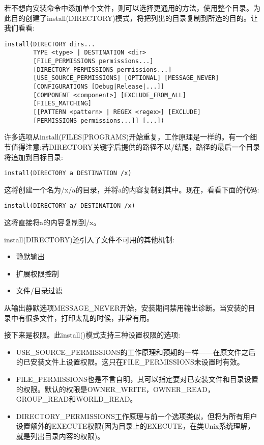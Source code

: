 若不想向安装命令中添加单个文件，则可以选择更通用的方法，使用整个目录。为此目的创建了install(DIRECTORY)模式，将把列出的目录复制到所选的目的。让我们看看:

\begin{lstlisting}[style=styleCMake]
install(DIRECTORY dirs...
		TYPE <type> | DESTINATION <dir>
		[FILE_PERMISSIONS permissions...]
		[DIRECTORY_PERMISSIONS permissions...]
		[USE_SOURCE_PERMISSIONS] [OPTIONAL] [MESSAGE_NEVER]
		[CONFIGURATIONS [Debug|Release|...]]
		[COMPONENT <component>] [EXCLUDE_FROM_ALL]
		[FILES_MATCHING]
		[[PATTERN <pattern> | REGEX <regex>] [EXCLUDE]
		[PERMISSIONS permissions...]] [...])
\end{lstlisting}

许多选项从install(FILES|PROGRAMS)开始重复，工作原理是一样的。有一个细节值得注意:若DIRECTORY关键字后提供的路径不以/结尾，路径的最后一个目录将追加到目标目录:

\begin{lstlisting}[style=styleCMake]
install(DIRECTORY a DESTINATION /x)
\end{lstlisting}

这将创建一个名为/x/a的目录，并将a的内容复制到其中。现在，看看下面的代码:

\begin{lstlisting}[style=styleCMake]
install(DIRECTORY a/ DESTINATION /x)
\end{lstlisting}

这将直接将a的内容复制到/x。

install(DIRECTORY)还引入了文件不可用的其他机制:

\begin{itemize}
\item 
静默输出

\item 
扩展权限控制

\item 
文件/目录过滤
\end{itemize}

从输出静默选项MESSAGE\_NEVER开始，安装期间禁用输出诊断。当安装的目录中有很多文件，打印太乱的时候，非常有用。

接下来是权限。此install()模式支持三种设置权限的选项:

\begin{itemize}
\item 
USE\_SOURCE\_PERMISSIONS的工作原理和预期的一样——在原文件之后的已安装文件上设置权限。这只在FILE\_PERMISSIONS未设置时有效。

\item 
FILE\_PERMISSIONS也是不言自明，其可以指定要对已安装文件和目录设置的权限。默认的权限是OWNER\_WRITE，OWNER\_READ，GROUP\_READ和WORLD\_READ。

\item 
DIRECTORY\_PERMISSIONS工作原理与前一个选项类似，但将为所有用户设置额外的EXECUTE权限(因为目录上的EXECUTE，在类Unix系统理解，就是列出目录内容的权限)。
\end{itemize}

